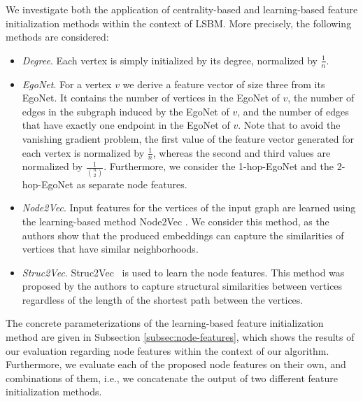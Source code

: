 \documentclass[draft,final]{vutinfth} %
\begin{document}
We investigate both the application of centrality-based and learning-based feature initialization methods within the context of LSBM. 
More precisely, the following methods are considered: 
\begin{itemize}
    \item \emph{Degree}. Each vertex is simply initialized by its degree, normalized by $\frac{1}{n}$. 
    \item \emph{EgoNet}. For a vertex $v$ we derive a feature vector of size three from its EgoNet. It contains the number of vertices in the EgoNet of $v$, the number of edges in the subgraph induced by the EgoNet of $v$, and the number of edges that have exactly one endpoint in the EgoNet of $v$. 
    Note that to avoid the vanishing gradient problem, the first value of the feature vector generated for each vertex is normalized by $\frac{1}{n}$, whereas the second and third values are normalized by $\frac{1}{\binom{n}{2}}$. 
    Furthermore, we consider the 1-hop-EgoNet and the 2-hop-EgoNet as separate node features. 
    \item \emph{Node2Vec}. Input features for the vertices of the input graph are learned using the learning-based method Node2Vec \cite{GroverL16}. We consider this method, as the authors show that the produced embeddings can capture the similarities of vertices that have similar neighborhoods. 
    \item \emph{Struc2Vec}. Struc2Vec~\cite{FigueiredoRS17} is used to learn the node features. This method was proposed by the authors to capture structural similarities between vertices regardless of the length of the shortest path between the vertices.  
\end{itemize}
The concrete parameterizations of the learning-based feature initialization method are given in Subsection \ref{subsec:node-features}, which shows the results of our evaluation regarding node features within the context of our algorithm. Furthermore, we evaluate each of the proposed node features on their own, and combinations of them, i.e., we concatenate the output of two different feature initialization methods. 
\end{document}

